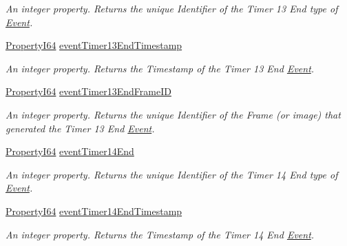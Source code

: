 \begin{DoxyCompactItemize}
\begin{DoxyCompactList}\small\item\em An integer property. Returns the unique Identifier of the Timer 13 End type of \hyperlink{classmv_i_m_p_a_c_t_1_1acquire_1_1_event}{Event}. \end{DoxyCompactList}\item 
\hyperlink{group___common_interface_ga81749b2696755513663492664a18a893}{Property\+I64} \hyperlink{classmv_i_m_p_a_c_t_1_1acquire_1_1_gen_i_cam_1_1_event_control_a10b19b959626efa201428c2417617836}{event\+Timer13\+End\+Timestamp}
\begin{DoxyCompactList}\small\item\em An integer property. Returns the Timestamp of the Timer 13 End \hyperlink{classmv_i_m_p_a_c_t_1_1acquire_1_1_event}{Event}. \end{DoxyCompactList}\item 
\hyperlink{group___common_interface_ga81749b2696755513663492664a18a893}{Property\+I64} \hyperlink{classmv_i_m_p_a_c_t_1_1acquire_1_1_gen_i_cam_1_1_event_control_a5eea49848730209fabcd3c1019c482b5}{event\+Timer13\+End\+Frame\+I\+D}
\begin{DoxyCompactList}\small\item\em An integer property. Returns the unique Identifier of the Frame (or image) that generated the Timer 13 End \hyperlink{classmv_i_m_p_a_c_t_1_1acquire_1_1_event}{Event}. \end{DoxyCompactList}\item 
\hyperlink{group___common_interface_ga81749b2696755513663492664a18a893}{Property\+I64} \hyperlink{classmv_i_m_p_a_c_t_1_1acquire_1_1_gen_i_cam_1_1_event_control_a1005dfcf7d3ef5d008897f30534be2ad}{event\+Timer14\+End}
\begin{DoxyCompactList}\small\item\em An integer property. Returns the unique Identifier of the Timer 14 End type of \hyperlink{classmv_i_m_p_a_c_t_1_1acquire_1_1_event}{Event}. \end{DoxyCompactList}\item 
\hyperlink{group___common_interface_ga81749b2696755513663492664a18a893}{Property\+I64} \hyperlink{classmv_i_m_p_a_c_t_1_1acquire_1_1_gen_i_cam_1_1_event_control_a84c0f0d57add6233ec8418783538e37e}{event\+Timer14\+End\+Timestamp}
\begin{DoxyCompactList}\small\item\em An integer property. Returns the Timestamp of the Timer 14 End \hyperlink{classmv_i_m_p_a_c_t_1_1acquire_1_1_event}{Event}. \end{DoxyCompactList}\item 

\end{DoxyCompactItemize}
